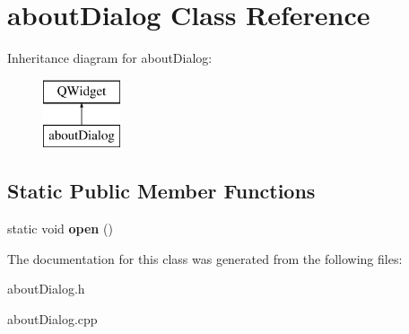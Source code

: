 \hypertarget{classabout_dialog}{}\section{about\+Dialog Class Reference}
\label{classabout_dialog}
Inheritance diagram for about\+Dialog\+:\begin{figure}[H]
\begin{center}
\leavevmode
\includegraphics[height=2.000000cm]{classabout_dialog}
\end{center}
\end{figure}
\subsection*{Static Public Member Functions}
\begin{DoxyCompactItemize}
\item 
static void {\bfseries open} ()\hypertarget{classabout_dialog_a7be2b15dd84e22bcf4373fa89182c344}{}\label{classabout_dialog_a7be2b15dd84e22bcf4373fa89182c344}

\end{DoxyCompactItemize}


The documentation for this class was generated from the following files\+:\begin{DoxyCompactItemize}
\item 
about\+Dialog.\+h\item 
about\+Dialog.\+cpp\end{DoxyCompactItemize}
